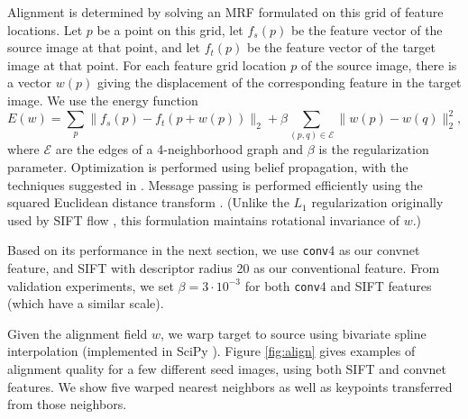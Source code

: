 \documentclass{article} %
\begin{document}
Alignment is determined by solving an MRF formulated on this grid of feature
locations.
Let $p$ be a point on this grid, let $f_s(p)$ be the feature vector of the
source image at that point, and let $f_t(p)$ be the feature vector of the target
image at that point.
For each feature grid location $p$ of the source image, there is a vector $w(p)$
giving the displacement of the corresponding feature in the target image.
We use the energy function
\[
E(w) = \sum_p \| f_s(p) - f_t(p + w(p)) \|_2 +
\beta \sum_{(p, q) \in \mathcal E} \| w(p) - w(q) \|_2^2,
\]
where $\mathcal E$ are the edges of a 4-neighborhood graph and $\beta$ is the
regularization parameter.
Optimization is performed using belief propagation, with the techniques
suggested in \cite{FHBP}.
Message passing is performed efficiently using the squared Euclidean distance
transform \cite{FHDT}.
(Unlike the $L_1$ regularization originally used by SIFT flow \cite{sift-flow},
this formulation maintains rotational invariance of $w$.)

Based on its performance in the next section, we use \texttt{conv}4 as our
convnet feature, and SIFT with descriptor radius 20 as our conventional feature.
From validation experiments, we set $\beta = 3 \cdot 10^{-3}$ for both
\texttt{conv}4 and SIFT features (which have a similar scale).

Given the alignment field $w$, we warp target to source using bivariate spline
interpolation (implemented in SciPy \cite{scipy}).
Figure \ref{fig:align} gives examples of alignment quality for a few different
seed images, using both SIFT and convnet features.
We show five warped nearest neighbors as well as keypoints transferred
from those neighbors.
\end{document}

